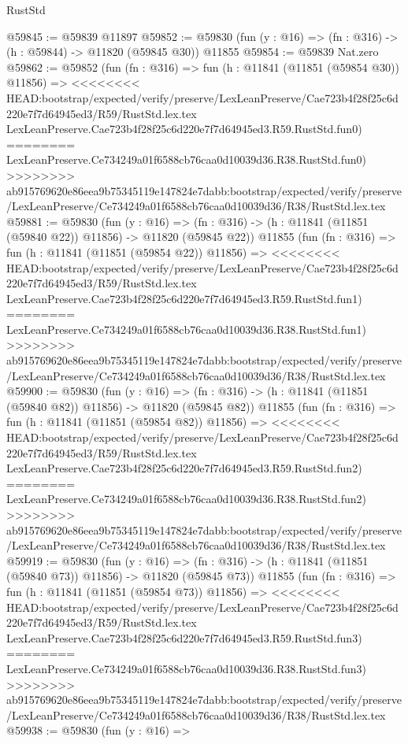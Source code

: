 \begin{lexlean}{RustStd}
\begin{coremodule}
{\begin{coremodule}
{{{{{{{{{{{{{{{{{{{{{{{{{{{{{{{{{{{{{{{{{{{{{{{{{{@59845 := @59839 @11897
@59852 := @59830 (fun (y : @16) => (fn : @316) -> (h : @59844) -> @11820 (@59845 @30)) @11855
@59854 := @59839 Nat.zero
@59862 := @59852
    (fun (fn : @316) =>
    fun (h : @11841 (@11851 (@59854 @30)) @11856) =>
<<<<<<<< HEAD:bootstrap/expected/verify/preserve/LexLeanPreserve/Cae723b4f28f25c6d220e7f7d64945ed3/R59/RustStd.lex.tex
    LexLeanPreserve.Cae723b4f28f25c6d220e7f7d64945ed3.R59.RustStd.fun0)
========
    LexLeanPreserve.Ce734249a01f6588cb76caa0d10039d36.R38.RustStd.fun0)
>>>>>>>> ab915769620e86eea9b75345119e147824e7dabb:bootstrap/expected/verify/preserve/LexLeanPreserve/Ce734249a01f6588cb76caa0d10039d36/R38/RustStd.lex.tex
@59881 := @59830
    (fun (y : @16) =>
    (fn : @316) -> (h : @11841 (@11851 (@59840 @22)) @11856) -> @11820 (@59845 @22))
    @11855
    (fun (fn : @316) =>
    fun (h : @11841 (@11851 (@59854 @22)) @11856) =>
<<<<<<<< HEAD:bootstrap/expected/verify/preserve/LexLeanPreserve/Cae723b4f28f25c6d220e7f7d64945ed3/R59/RustStd.lex.tex
    LexLeanPreserve.Cae723b4f28f25c6d220e7f7d64945ed3.R59.RustStd.fun1)
========
    LexLeanPreserve.Ce734249a01f6588cb76caa0d10039d36.R38.RustStd.fun1)
>>>>>>>> ab915769620e86eea9b75345119e147824e7dabb:bootstrap/expected/verify/preserve/LexLeanPreserve/Ce734249a01f6588cb76caa0d10039d36/R38/RustStd.lex.tex
@59900 := @59830
    (fun (y : @16) =>
    (fn : @316) -> (h : @11841 (@11851 (@59840 @82)) @11856) -> @11820 (@59845 @82))
    @11855
    (fun (fn : @316) =>
    fun (h : @11841 (@11851 (@59854 @82)) @11856) =>
<<<<<<<< HEAD:bootstrap/expected/verify/preserve/LexLeanPreserve/Cae723b4f28f25c6d220e7f7d64945ed3/R59/RustStd.lex.tex
    LexLeanPreserve.Cae723b4f28f25c6d220e7f7d64945ed3.R59.RustStd.fun2)
========
    LexLeanPreserve.Ce734249a01f6588cb76caa0d10039d36.R38.RustStd.fun2)
>>>>>>>> ab915769620e86eea9b75345119e147824e7dabb:bootstrap/expected/verify/preserve/LexLeanPreserve/Ce734249a01f6588cb76caa0d10039d36/R38/RustStd.lex.tex
@59919 := @59830
    (fun (y : @16) =>
    (fn : @316) -> (h : @11841 (@11851 (@59840 @73)) @11856) -> @11820 (@59845 @73))
    @11855
    (fun (fn : @316) =>
    fun (h : @11841 (@11851 (@59854 @73)) @11856) =>
<<<<<<<< HEAD:bootstrap/expected/verify/preserve/LexLeanPreserve/Cae723b4f28f25c6d220e7f7d64945ed3/R59/RustStd.lex.tex
    LexLeanPreserve.Cae723b4f28f25c6d220e7f7d64945ed3.R59.RustStd.fun3)
========
    LexLeanPreserve.Ce734249a01f6588cb76caa0d10039d36.R38.RustStd.fun3)
>>>>>>>> ab915769620e86eea9b75345119e147824e7dabb:bootstrap/expected/verify/preserve/LexLeanPreserve/Ce734249a01f6588cb76caa0d10039d36/R38/RustStd.lex.tex
@59938 := @59830
    (fun (y : @16) =>
}}}}}}}}}}}}}}}}}}}}}}}}}}}}}}}}}}}}}}}}}}}}}}}}}}
\end{coremodule}}
\end{coremodule}
\end{lexlean}
